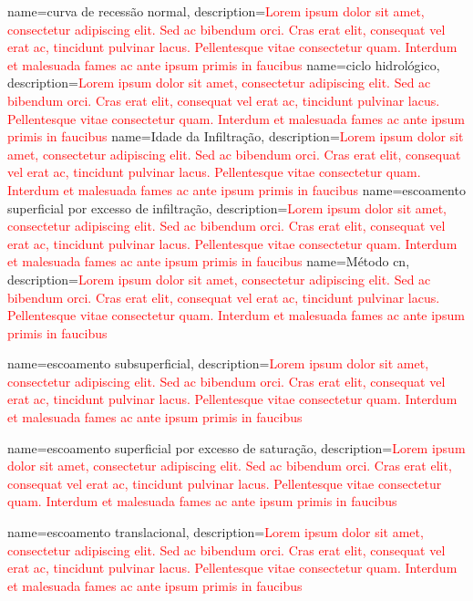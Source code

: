 {
    name=curva de recessão normal,
    description={\textcolor{red}{Lorem ipsum dolor sit amet, consectetur adipiscing elit. Sed ac bibendum orci. Cras erat elit, consequat vel erat ac, tincidunt pulvinar lacus. Pellentesque vitae consectetur quam. Interdum et malesuada fames ac ante ipsum primis in faucibus}}
}
{
    name=ciclo hidrológico,
    description={\textcolor{red}{Lorem ipsum dolor sit amet, consectetur adipiscing elit. Sed ac bibendum orci. Cras erat elit, consequat vel erat ac, tincidunt pulvinar lacus. Pellentesque vitae consectetur quam. Interdum et malesuada fames ac ante ipsum primis in faucibus}}
}
{
    name=Idade da Infiltração,
    description={\textcolor{red}{Lorem ipsum dolor sit amet, consectetur adipiscing elit. Sed ac bibendum orci. Cras erat elit, consequat vel erat ac, tincidunt pulvinar lacus. Pellentesque vitae consectetur quam. Interdum et malesuada fames ac ante ipsum primis in faucibus}}
}
{
    name=escoamento superficial por excesso de infiltração,
    description={\textcolor{red}{Lorem ipsum dolor sit amet, consectetur adipiscing elit. Sed ac bibendum orci. Cras erat elit, consequat vel erat ac, tincidunt pulvinar lacus. Pellentesque vitae consectetur quam. Interdum et malesuada fames ac ante ipsum primis in faucibus}}
}
{
    name=Método \acrfull{cn},
    description={\textcolor{red}{Lorem ipsum dolor sit amet, consectetur adipiscing elit. Sed ac bibendum orci. Cras erat elit, consequat vel erat ac, tincidunt pulvinar lacus. Pellentesque vitae consectetur quam. Interdum et malesuada fames ac ante ipsum primis in faucibus}}
}

{
    name=escoamento subsuperficial,
    description={\textcolor{red}{Lorem ipsum dolor sit amet, consectetur adipiscing elit. Sed ac bibendum orci. Cras erat elit, consequat vel erat ac, tincidunt pulvinar lacus. Pellentesque vitae consectetur quam. Interdum et malesuada fames ac ante ipsum primis in faucibus}}
}

{
    name=escoamento superficial por excesso de saturação,
    description={\textcolor{red}{Lorem ipsum dolor sit amet, consectetur adipiscing elit. Sed ac bibendum orci. Cras erat elit, consequat vel erat ac, tincidunt pulvinar lacus. Pellentesque vitae consectetur quam. Interdum et malesuada fames ac ante ipsum primis in faucibus}}
}

{
    name=escoamento translacional,
    description={\textcolor{red}{Lorem ipsum dolor sit amet, consectetur adipiscing elit. Sed ac bibendum orci. Cras erat elit, consequat vel erat ac, tincidunt pulvinar lacus. Pellentesque vitae consectetur quam. Interdum et malesuada fames ac ante ipsum primis in faucibus}}
}

